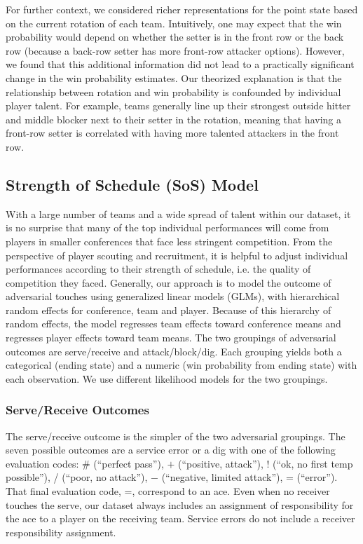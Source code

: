\documentclass{article}
\begin{document}
For further context, we considered richer representations for the point state based on the current rotation of each team. Intuitively, one may expect that the win probability would depend on whether the setter is in the front row or the back row (because a back-row setter has more front-row attacker options). However, we found that this additional information did not lead to a practically significant change in the win probability estimates. Our theorized explanation is that the relationship between rotation and win probability is confounded by individual player talent. For example, teams generally line up their strongest outside hitter and middle blocker next to their setter in the rotation, meaning that having a front-row setter is correlated with having more talented attackers in the front row.

\subsection{Strength of Schedule (SoS) Model}
\label{sec:strength-of-schedule}

With a large number of teams and a wide spread of talent within our dataset, it is no surprise that many of the top individual performances will come from players in smaller conferences that face less stringent competition. From the perspective of player scouting and recruitment, it is helpful to adjust individual performances according to their strength of schedule, i.e. the quality of competition they faced. Generally, our approach is to model the outcome of adversarial touches using generalized linear models (GLMs), with hierarchical random effects for conference, team and player. Because of this hierarchy of random effects, the model regresses team effects toward conference means and regresses player effects toward team means. The two groupings of adversarial outcomes are serve/receive and attack/block/dig. Each grouping yields both a categorical (ending state) and a numeric (win probability from ending state) with each observation. We use different likelihood models for the two groupings.

\subsubsection{Serve/Receive Outcomes}

The serve/receive outcome is the simpler of the two adversarial groupings. The seven possible outcomes are a service error or a dig with one of the following evaluation codes: \# (``perfect pass''), $+$ (``positive, attack''), $!$ (``ok, no first temp possible''), / (``poor, no attack''), $-$ (``negative, limited attack''), = (``error''). That final evaluation code, =, correspond to an ace. Even when no receiver touches the serve, our dataset always includes an assignment of responsibility for the ace to a player on the receiving team. Service errors do not include a receiver responsibility assignment.
\end{document}

